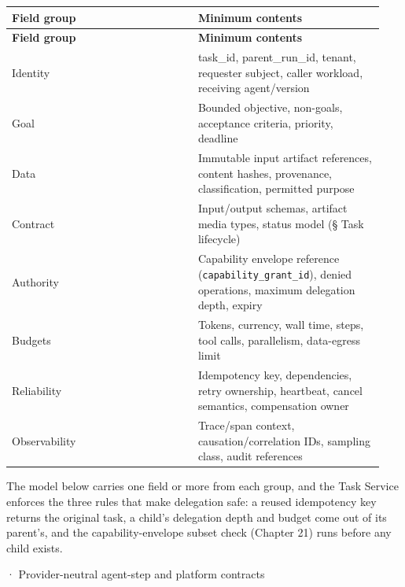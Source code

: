 \BookTableStart
\small
\begin{longtable}{@{}Y{0.4700\linewidth}Y{0.4700\linewidth}@{}}
\color{white}\bfseries \textbf{Field group} & \color{white}\bfseries \textbf{Minimum contents} \\
\endfirsthead
{}
\color{white}\bfseries \textbf{Field group} & \color{white}\bfseries \textbf{Minimum contents} \\
\endhead
Identity & task\_id, parent\_run\_id, tenant, requester subject, caller workload, receiving agent/version \\
Goal & Bounded objective, non-goals, acceptance criteria, priority, deadline \\
Data & Immutable input artifact references, content hashes, provenance, classification, permitted purpose \\
Contract & Input/output schemas, artifact media types, status model (§ Task lifecycle) \\
Authority & Capability envelope reference (\lstinline[style=bookinline]!capability_grant_id!), denied operations, maximum delegation depth, expiry \\
Budgets & Tokens, currency, wall time, steps, tool calls, parallelism, data-egress limit \\
Reliability & Idempotency key, dependencies, retry ownership, heartbeat, cancel semantics, compensation owner \\
Observability & Trace/span context, causation/correlation IDs, sampling class, audit references \\
\end{longtable}
\BookTableEnd

The model below carries one field or more from each group, and the Task Service enforces the three rules that make delegation safe: a reused idempotency key returns the original task, a child's delegation depth and budget come out of its parent's, and the capability-envelope subset check (Chapter 21) runs before any child exists.\par

\BookSnake · Provider-neutral agent-step and platform contracts\par

